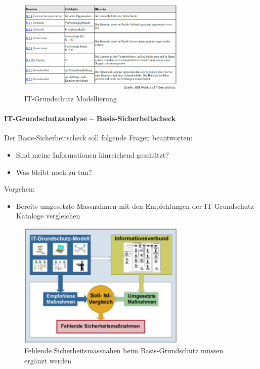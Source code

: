 \documentclass[10pt,a4paper]{article}
\begin{document}
\begin{figure}[H]
    \begin{center}
    \includegraphics[width=8cm]{images/IT-Grundschutz Modellierung.png}
    \caption{IT-Grundschutz Modellierung}
    \label{IT-Grundschutz Modellierung}
    \end{center}
\end{figure}

\paragraph*{IT-Grundschutzanalyse – Basis-Sicherheitscheck} Der Basis-Sicherheitscheck soll folgende
Fragen beantworten:
\begin{itemize}[noitemsep,topsep=0pt,leftmargin=*]
    \item Sind meine Informationen hinreichend
    geschützt?
    \item Was bleibt noch zu tun?
\end{itemize}
\noindent
Vorgehen:
\begin{itemize}[noitemsep,topsep=0pt,leftmargin=*]
    \item Bereits umgesetzte Massnahmen mit den
    Empfehlungen der IT-Grundschutz-Kataloge vergleichen
\end{itemize}

\begin{figure}[H]
    \begin{center}
    \includegraphics[width=8cm]{images/Grundschutz basis.png}
    \caption{Fehlende Sicherheitsmassnahen beim Basis-Grundschutz müssen ergänzt werden}
    \label{grundschutzbasis}
    \end{center}
\end{figure}
\end{document}
